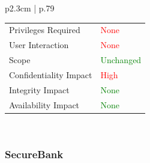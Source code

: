 \begin{longtable}[l]{ p{2.3cm} | p{.79\linewidth} }
\begin{tabular}[t]{@{}l | l}
            Privileges Required     & \textcolor{red}{None} \\
            User Interaction        & \textcolor{red}{None} \\
            Scope                   & \textcolor{Green}{Unchanged} \\
            Confidentiality Impact  & \textcolor{red}{High} \\
            Integrity Impact        & \textcolor{Green}{None} \\
            Availability Impact     & \textcolor{Green}{None}
        \end{tabular}
    \\ \hline
\end{longtable}

\subsubsection{SecureBank}
